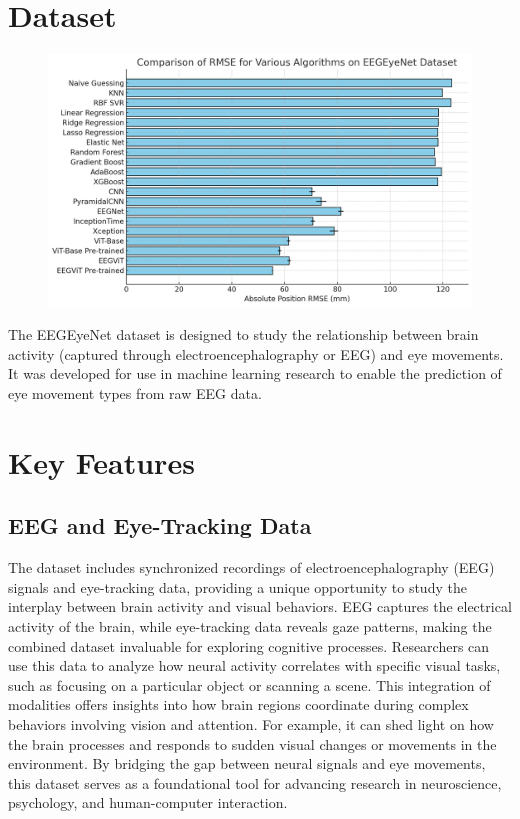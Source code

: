 \documentclass{article}
\begin{document}
\section {Dataset}

\begin{figure}

\includegraphics[width=1\linewidth]{EEGEYENet.png}

\end{figure}

The EEGEyeNet dataset is designed to study the relationship between brain activity (captured through electroencephalography or EEG) and eye movements. It was developed for use in machine learning research to enable the prediction of eye movement types from raw EEG data.

\section{Key Features}

\subsection{EEG and Eye-Tracking Data}
The dataset includes synchronized recordings of electroencephalography (EEG) signals and eye-tracking data, providing a unique opportunity to study the interplay between brain activity and visual behaviors. EEG captures the electrical activity of the brain, while eye-tracking data reveals gaze patterns, making the combined dataset invaluable for exploring cognitive processes. Researchers can use this data to analyze how neural activity correlates with specific visual tasks, such as focusing on a particular object or scanning a scene. This integration of modalities offers insights into how brain regions coordinate during complex behaviors involving vision and attention. For example, it can shed light on how the brain processes and responds to sudden visual changes or movements in the environment. By bridging the gap between neural signals and eye movements, this dataset serves as a foundational tool for advancing research in neuroscience, psychology, and human-computer interaction.
\end{document}

